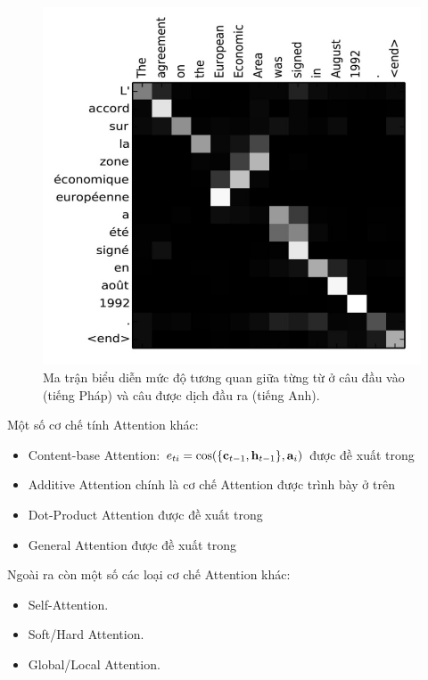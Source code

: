 \documentclass[14pt, a4paper]{article}
\numberwithin{equation}{section}
\numberwithin{algorithm}{section}
\numberwithin{figure}{section}
\numberwithin{table}{section}
\numberwithin{dl}{section}
\numberwithin{md}{section}
\numberwithin{bd}{section}
\numberwithin{dn}{section}
\numberwithin{hq}{section}
\begin{document}
    \begin{figure}[h!] \centering

        \includegraphics[scale=0.5]{Attention_Map.jpg}
        \caption{Ma trận biểu diễn mức độ tương quan giữa từng từ ở câu đầu vào (tiếng Pháp) và câu được dịch đầu ra (tiếng Anh).}
    
        \label{fig:Attention_Map}
    \end{figure}

    Một số cơ chế tính Attention khác:

    \begin{itemize}
        \item Content-base Attention: $e_{ti}=\cos(\lbrace \bold{c}_{t-1}, \bold{h}_{t-1} \rbrace, \bold{a}_i)$ được đề xuất trong \cite{graves2014neural}
        \item Additive Attention chính là cơ chế Attention được trình bày ở trên \cite{bahdanau2014neural}
        \item Dot-Product Attention được đề xuất trong \cite{luong2015effective}
        \item General Attention được đề xuất trong \cite{luong2015effective}
    \end{itemize}

    Ngoài ra còn một số các loại cơ chế Attention khác:

    \begin{itemize}
        \item Self-Attention.
        \item Soft/Hard Attention.
        \item Global/Local Attention.
    \end{itemize}
\end{document}
